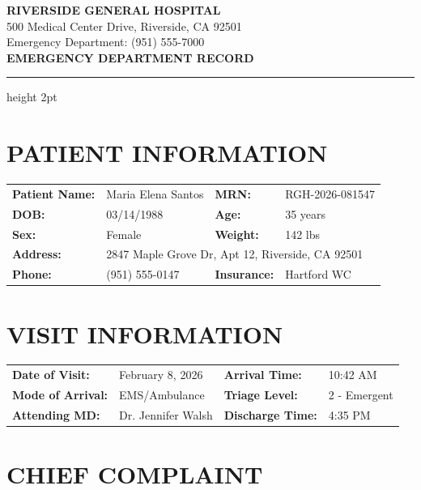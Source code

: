\documentclass[11pt]{article}
\begin{document}
\begin{center}
{\Large\bfseries\color{medblue} RIVERSIDE GENERAL HOSPITAL}\\[0.3em]
{\small 500 Medical Center Drive, Riverside, CA 92501}\\
{\small Emergency Department: (951) 555-7000}\\[1em]
{\LARGE\bfseries EMERGENCY DEPARTMENT RECORD}
\end{center}

\vspace{0.5em}
\hrule height 2pt
\vspace{1em}

\section*{PATIENT INFORMATION}

\begin{tabular}{@{}p{3.5cm}p{5cm}p{3cm}p{4cm}@{}}
\textbf{Patient Name:} & Maria Elena Santos & \textbf{MRN:} & RGH-2026-081547 \\
\textbf{DOB:} & 03/14/1988 & \textbf{Age:} & 35 years \\
\textbf{Sex:} & Female & \textbf{Weight:} & 142 lbs \\
\textbf{Address:} & \multicolumn{3}{l}{2847 Maple Grove Dr, Apt 12, Riverside, CA 92501} \\
\textbf{Phone:} & (951) 555-0147 & \textbf{Insurance:} & Hartford WC \\
\end{tabular}

\section*{VISIT INFORMATION}

\begin{tabular}{@{}p{3.5cm}p{5cm}p{3cm}p{4cm}@{}}
\textbf{Date of Visit:} & February 8, 2026 & \textbf{Arrival Time:} & 10:42 AM \\
\textbf{Mode of Arrival:} & EMS/Ambulance & \textbf{Triage Level:} & 2 - Emergent \\
\textbf{Attending MD:} & Dr. Jennifer Walsh & \textbf{Discharge Time:} & 4:35 PM \\
\end{tabular}

\section*{CHIEF COMPLAINT}
\end{document}
